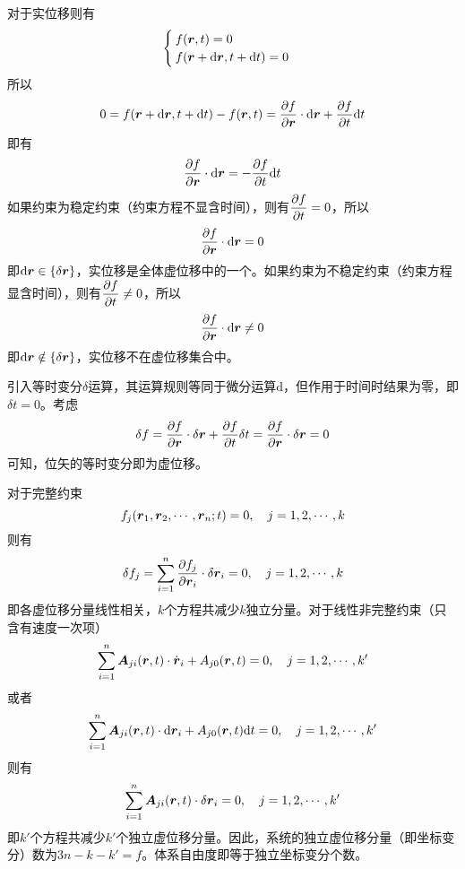 对于实位移则有
\begin{equation*}
	\begin{cases}
		f(\boldsymbol{r},t) = 0 \\
		f(\boldsymbol{r}+\mathrm{d} \boldsymbol{r},t+\mathrm{d} t) = 0
	\end{cases}
\end{equation*}
所以
\begin{equation*}
	0 = f(\boldsymbol{r}+\mathrm{d} \boldsymbol{r},t+\mathrm{d} t) - f(\boldsymbol{r},t) = \frac{\partial f}{\partial \boldsymbol{r}} \cdot \mathrm{d}\boldsymbol{r} + \frac{\partial f}{\partial t} \mathrm{d} t
\end{equation*}
即有
\begin{equation*}
	\frac{\partial f}{\partial \boldsymbol{r}} \cdot \mathrm{d} \boldsymbol{r} = - \frac{\partial f}{\partial t} \mathrm{d} t
\end{equation*}
如果约束为{\heiti 稳定约束}（约束方程不显含时间），则有$\dfrac{\partial f}{\partial t} = 0$，所以
\begin{equation*}
	\frac{\partial f}{\partial \boldsymbol{r}} \cdot \mathrm{d} \boldsymbol{r} = 0
\end{equation*}
即$\mathrm{d} \boldsymbol{r} \in \{\delta \boldsymbol{r}\}$，实位移是全体虚位移中的一个。如果约束为{\heiti 不稳定约束}（约束方程显含时间），则有$\dfrac{\partial f}{\partial t} \neq 0$，所以
\begin{equation*}
	\frac{\partial f}{\partial \boldsymbol{r}} \cdot \mathrm{d} \boldsymbol{r} \neq 0
\end{equation*}
即$\mathrm{d} \boldsymbol{r} \notin \{\delta \boldsymbol{r}\}$，实位移不在虚位移集合中。

引入等时变分$\delta$运算，其运算规则等同于微分运算$\mathrm{d}$，但作用于时间时结果为零，即$\delta t=0$。考虑
\begin{equation*}
	\delta f = \frac{\partial f}{\partial \boldsymbol{r}} \cdot \delta \boldsymbol{r} + \frac{\partial f}{\partial t} \delta t = \frac{\partial f}{\partial \boldsymbol{r}} \cdot \delta \boldsymbol{r} = 0
\end{equation*}
可知，位矢的等时变分即为虚位移。

对于完整约束
\begin{equation*}
	f_j(\boldsymbol{r}_1,\boldsymbol{r}_2,\cdots,\boldsymbol{r}_n;t) = 0,\quad j = 1,2,\cdots,k
\end{equation*}
则有
\begin{equation*}
	\delta f_j = \sum_{i=1}^n \frac{\partial f_j}{\partial \boldsymbol{r}_i} \cdot \delta \boldsymbol{r}_i = 0,\quad j = 1,2,\cdots,k
\end{equation*}
即各虚位移分量线性相关，$k$个方程共减少$k$独立分量。对于线性非完整约束（只含有速度一次项）
\begin{equation*}
	\sum_{i=1}^n \boldsymbol{A}_{ji}(\boldsymbol{r},t) \cdot \dot{\boldsymbol{r}}_i + A_{j0}(\boldsymbol{r},t) = 0,\quad j=1,2,\cdots,k'
\end{equation*}
或者
\begin{equation*}
	\sum_{i=1}^n \boldsymbol{A}_{ji}(\boldsymbol{r},t) \cdot \mathrm{d} \boldsymbol{r}_i + A_{j0}(\boldsymbol{r},t) \mathrm{d}t = 0,\quad j=1,2,\cdots,k'
\end{equation*}
则有
\begin{equation*}
	\sum_{i=1}^n \boldsymbol{A}_{ji}(\boldsymbol{r},t) \cdot \delta \boldsymbol{r}_i = 0,\quad j=1,2,\cdots,k'
\end{equation*}
即$k'$个方程共减少$k'$个独立虚位移分量。因此，系统的独立虚位移分量（即坐标变分）数为$3n-k-k'=f$。体系自由度即等于独立坐标变分个数。

